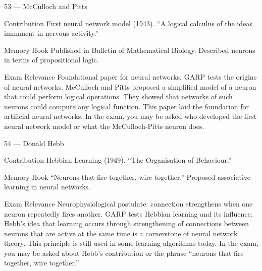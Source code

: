 \documentclass[aspectratio=169,8pt]{beamer}
\begin{document}
	\begin{frame}{53 --- McCulloch and Pitts}
		\begin{block}{Contribution}
			First neural network model (1943). ``A logical calculus of the ideas immanent in nervous activity.''
		\end{block}
		\begin{block}{Memory Hook}
			Published in Bulletin of Mathematical Biology. Described neurons in terms of propositional logic.
		\end{block}
		\begin{block}{Exam Relevance}
			Foundational paper for neural networks. GARP tests the origins of neural networks. McCulloch and Pitts proposed a simplified model of a neuron that could perform logical operations. They showed that networks of such neurons could compute any logical function. This paper laid the foundation for artificial neural networks. In the exam, you may be asked who developed the first neural network model or what the McCulloch-Pitts neuron does.
		\end{block}
	\end{frame}
	
	\begin{frame}{54 --- Donald Hebb}
		\begin{block}{Contribution}
			Hebbian Learning (1949). ``The Organisation of Behaviour.''
		\end{block}
		\begin{block}{Memory Hook}
			``Neurons that fire together, wire together.'' Proposed associative learning in neural networks.
		\end{block}
		\begin{block}{Exam Relevance}
			Neurophysiological postulate: connection strengthens when one neuron repeatedly fires another. GARP tests Hebbian learning and its influence. Hebb's idea that learning occurs through strengthening of connections between neurons that are active at the same time is a cornerstone of neural network theory. This principle is still used in some learning algorithms today. In the exam, you may be asked about Hebb's contribution or the phrase ``neurons that fire together, wire together.''
		\end{block}
	\end{frame}
	
\end{document}
